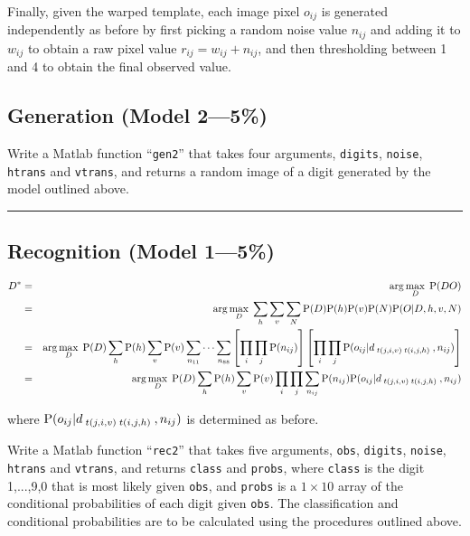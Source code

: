 \documentclass[12pt]{article}
\begin{document}
Finally, given the warped template, each image pixel $o_{ij}$ is generated 
independently as before by
first picking a random noise value $n_{ij}$ and adding it to
$w_{ij}$ to obtain a raw pixel value $r_{ij}=w_{ij}+n_{ij}$,
and then thresholding between 1 and 4 to obtain the final observed value.
 
\subsection{Generation \rm(Model 2---5\%)}
 
Write a Matlab function ``{\tt gen2}'' that takes four arguments,
{\tt digits}, {\tt noise}, {\tt htrans} and {\tt vtrans}, 
and returns a random image of a 
digit generated by the model outlined above.


\vspace*{1\baselineskip}

\hrule

\subsection{Recognition \rm(Model 1---5\%)}

\begin{eqnarray*}
D^*
& = & \arg\max_D \; {\rm P}(DO)
\\
& = & \arg\max_D \; \sum_h\sum_v\sum_N {\rm P}(D){\rm P}(h){\rm P}(v){\rm P}(N){\rm P}(O|D,h,v,N)
\\
& = & \arg\max_D \; {\rm P}(D)\sum_h{\rm P}(h)\sum_v{\rm P}(v)\sum_{n_{11}}\cdots\sum_{n_{88}} 
\left[\prod_i\prod_j{\rm P}(n_{ij})\right]
\left[\prod_i\prod_j {\rm P}(o_{ij}|d_{\;t(j,i,v)\;t(i,j,h)\;},n_{ij}) \right]
\\
& = & \arg\max_D \; {\rm P}(D)\sum_h{\rm P}(h)\sum_v{\rm P}(v)
\prod_i\prod_j \sum_{n_{ij}} {\rm P}(n_{ij}){\rm P}(o_{ij}|d_{\;t(j,i,v)\;t(i,j,h)\;},n_{ij})
\end{eqnarray*}

where %
${\rm P}(o_{ij}|d_{\;t(j,i,v)\;t(i,j,h)\;},n_{ij})$ is determined as before.


\bigskip

Write a Matlab function ``{\tt rec2}'' that takes five arguments,
{\tt obs}, {\tt digits}, {\tt noise}, {\tt htrans} and {\tt vtrans},
and returns {\tt class} and {\tt probs},
where {\tt class} is the digit 1,...,9,0 that is most likely given
{\tt obs}, and {\tt probs} is a $1\times10$ array of the conditional
probabilities of each digit given {\tt obs}.
The classification and conditional probabilities are to be calculated
using the procedures outlined above.
\end{document}
